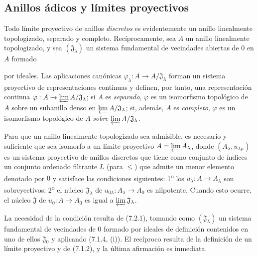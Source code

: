 \subsection{Anillos ádicos y límites proyectivos}
\label{subsection:0.7.2-fr}

\begin{env}[7.2.1]
\label{0.7.2.1-fr}
Todo límite proyectivo de anillos \emph{discretos} es evidentemente un anillo
linealmente topologizado, separado y completo. Recíprocamente, sea $A$ un anillo
linealmente topologizado, y sea $(\mathfrak J_\lambda)$ un sistema fundamental
de vecindades abiertas de $0$ en $A$ formado


por ideales. Las aplicaciones canónicas
$\varphi_\lambda:A\to A/\mathfrak J_\lambda$ forman un sistema proyectivo de
representaciones continuas y definen, por tanto, una representación continua
$\varphi:A\to\varprojlim A/\mathfrak J_\lambda$; si $A$ es \emph{separado},
$\varphi$ es un isomorfismo topológico de $A$ sobre un
subanillo denso en $\varprojlim A/\mathfrak J_\lambda$; si, además,
$A$ es \emph{completo}, $\varphi$ es un isomorfismo topológico de $A$ \emph{sobre}
$\varprojlim A/\mathfrak J_\lambda$.
\end{env}

\begin{lemma}[7.2.2]
\label{0.7.2.2-fr}
Para que un anillo linealmente topologizado sea admisible, es necesario y suficiente
que sea isomorfo a un límite proyectivo
$A=\varprojlim A_\lambda$, donde $(A_\lambda,u_{\lambda\mu})$ es un sistema
proyectivo de anillos discretos que tiene como conjunto de índices un conjunto ordenado
filtrante $L$ (para $\leq$) que admite un menor elemento denotado por $0$ y satisface
las condiciones siguientes: 1\textsuperscript{o} los
$u_\lambda:A\to A_\lambda$ son sobreyectivos; 2\textsuperscript{o} el núcleo
$\mathfrak J_\lambda$ de $u_{0\lambda}:A_\lambda\to A_0$ es nilpotente.
Cuando esto ocurre, el núcleo $\mathfrak J$ de $u_0:A\to A_0$ es igual a
$\varprojlim\mathfrak J_\lambda$.
\end{lemma}

La necesidad de la condición resulta de (7.2.1), tomando como
$(\mathfrak J_\lambda)$ un sistema fundamental de vecindades de $0$ formado
por ideales de definición contenidos en uno de ellos $\mathfrak J_0$ y aplicando
(7.1.4, (i)). El recíproco resulta de la definición de un límite proyectivo y
de (7.1.2), y la última afirmación es inmediata.

